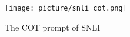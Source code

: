 




\begin{figure}[!ht]
\centering
\vspace{0.1in}
\texttt{[image: picture/snli\_cot.png]}
\vspace{0.1in}
\caption{The COT prompt of SNLI}
\label{fig:cot_snli}
\vspace{0.1in}
\end{figure}

